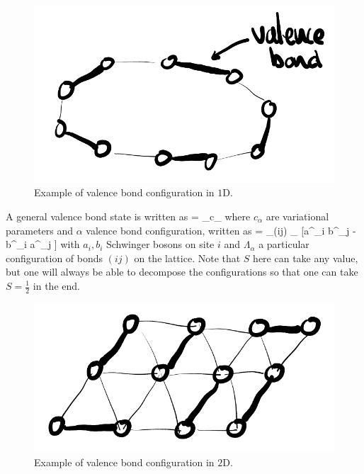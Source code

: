 		\begin{figure}[h!]
            \centering
            \includegraphics[scale=0.2]{graphs/VBS1.png}
            \caption{Example of valence bond configuration in $1$D.}
            \label{fig:VBS1}
        \end{figure}

		A general valence bond state is written as
		\be {} = \sum_\alpha c_\alpha \ket \alpha \label{eq:vbs} \ee
		where $c_\alpha$ are variational parameters and $\alpha$ valence bond configuration, written as
		\be \ket \alpha = \prod_{(ij) \in \Lambda_\alpha} [a^\dagger_i b^\dagger_j - b^\dagger_i a^\dagger_j ] \ee
		with $a_i,b_i$ Schwinger bosons on site $i$ and $\Lambda_\alpha$ a particular configuration of bonds $(ij)$ on the lattice. Note that $S$ here can take any value, but one will always be able to decompose the configurations so that one can take $S=\frac{1}{2}$ in the end.

        \begin{figure}[h!]
            \centering
            \includegraphics[scale=0.2]{graphs/VBS2.png}
            \caption{Example of valence bond configuration in $2$D.}
            \label{fig:VBS2}
        \end{figure}

